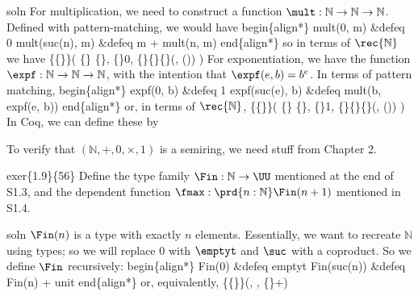 soln For multiplication, we need to construct a function $\mult : \mathbb{N}
\to \mathbb{N} \to \mathbb{N}$.  Defined with pattern-matching, we would have
begin\{align*\}
  mult(0, m) \&defeq 0 
  mult(suc(n), m) \&defeq m + mult(n, m)
end\{align*\}
so in terms of $\rec{\mathbb{N}}$ we have
    
  \{\{\}\}(
  \{\}  \{\},
  \{\}0,
  \{\}\{\}\{\}(, ())
  )
For exponentiation, we have the function $\expf: \mathbb{N} \to \mathbb{N} \to
\mathbb{N}$, with the intention that $\expf(e, b) = b^{e}$.  In terms of pattern
matching,
begin\{align*\}
  expf(0, b) \&defeq 1 
  expf(suc(e), b) \&defeq mult(b, expf(e, b))
end\{align*\}
or, in terms of $\rec{\mathbb{N}}$,
    \{\{\}\}(
    \{\}  \{\},
    \{\}1,
    \{\}\{\}\{\}(, ())
  )
In Coq, we can define these by


To verify that $(\mathbb{N}, +, 0, \times, 1)$ is a semiring, we need stuff
from Chapter 2.


exer\{1.9\}\{56\}  Define the type family $\Fin : \mathbb{N} \to \UU$
mentioned at the end of S1.3, and the dependent function $\fmax :
\prd{n : \mathbb{N}} \Fin(n + 1)$ mentioned in S1.4.


soln  $\Fin(n)$ is a type with exactly $n$ elements.  Essentially, we want to
recreate $\mathbb{N}$ using types; so we will replace $0$ with $\emptyt$ and
$\suc$ with a coproduct.  So we define $\Fin$ recursively:
begin\{align*\}
  Fin(0) \&defeq emptyt 
  Fin(suc(n)) \&defeq Fin(n) + unit
end\{align*\}
or, equivalently,
    \{\{\}\}(, , \{\}+)


